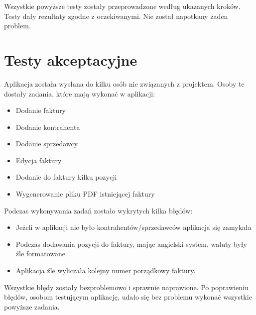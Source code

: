Wszystkie powyższe testy zostały przeprowadzone według ukazanych kroków. Testy dały rezultaty zgodne z oczekiwanymi. Nie został napotkany żaden problem.

\section{Testy akceptacyjne}
Aplikacja została wysłana do kilku osób nie związanych z projektem. Osoby te dostały zadania, które mają wykonać w aplikacji:
\begin{itemize}
    \item Dodanie faktury
    \item Dodanie kontrahenta
    \item Dodanie sprzedawcy
    \item Edycja faktury
    \item Dodanie do faktury kilku pozycji
    \item Wygenerowanie pliku PDF istniejącej faktury
\end{itemize}

Podczas wykonywania zadań zostało wykrytych kilka błędów:
\begin{itemize}
    \item Jeżeli w aplikacji nie było kontrahentów/sprzedawców aplikacja się zamykała
    \item Podczas dodawania pozycji do faktury, mając angielski system, waluty były źle formatowane
    \item Aplikacja źle wyliczała kolejny numer porządkowy faktury.
\end{itemize}

Wszystkie błędy zostały bezproblemowo i sprawnie naprawione. Po poprawieniu błędów, osobom testującym aplikację, udało się bez problemu wykonać wszystkie powyższe zadania.